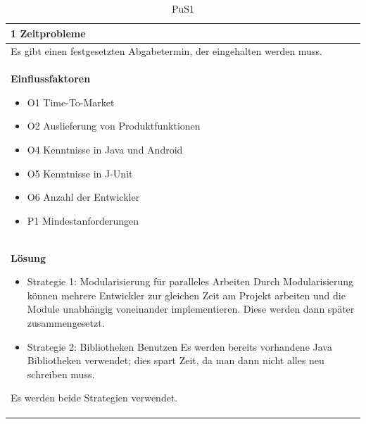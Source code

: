 \documentclass[fontsize=12pt,paper=a4,twoside]{scrartcl}
\begin{document}
\begin{table}[H]
\caption{PuS1}
\begin{tabular}{|p{\textwidth}|}\hline
1 Zeitprobleme\\ \hline
Es gibt einen festgesetzten Abgabetermin, der eingehalten werden muss.\\ \hline
\textbf{Einflussfaktoren}
\begin{itemize}
\item O1 Time-To-Market
\item O2 Auslieferung von Produktfunktionen
\item O4 Kenntnisse in Java  und Android
\item O5 Kenntnisse in J-Unit
\item O6 Anzahl der Entwickler
\item P1 Mindestanforderungen
\end{itemize}\\ \hline
\textbf{Lösung}
\begin{itemize}
\item Strategie 1: Modularisierung für paralleles Arbeiten \leavevmode\newline
Durch Modularisierung können mehrere Entwickler zur gleichen Zeit am Projekt arbeiten und die Module unabhängig voneinander implementieren. Diese werden dann später zusammengesetzt.
\item Strategie 2: Bibliotheken Benutzen \leavevmode\newline
Es werden bereits vorhandene Java Bibliotheken verwendet; dies spart Zeit, da man dann nicht alles neu schreiben muss.
\end{itemize}
Es werden beide Strategien verwendet.\\ \hline
\end{tabular}
\end{table}
\end{document}
